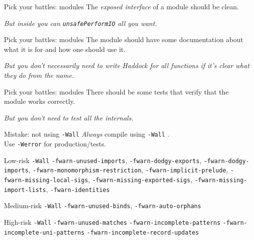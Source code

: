 \documentclass[20pt]{beamer}
\newcommand{\vspaced}{
    \vspace{5mm}
}
\newcommand{\code}[1]{
    \texttt{\small{#1}}
}
\begin{document}
\begin{frame}{Pick your battles: modules}
    The \emph{exposed interface} of a module should be clean. \\
    \vspaced
    \emph{\small{But inside you can \code{unsafePerformIO} all you want.}}
\end{frame}

\begin{frame}{Pick your battles: modules}
    The module should have some documentation about what it is for and how one
    should use it. \\
    \vspaced
    \emph{\small{But you don't necessarily need to write Haddock for all
    functions if it's clear what they do from the name.}}
\end{frame}

\begin{frame}{Pick your battles: modules}
    There should be some tests that verify that the module works correctly. \\
    \vspaced
    \emph{\small{But you don't need to test all the internals.}}
\end{frame}


\begin{frame}{Mistake: not using \code{-Wall}}
    \emph{Always} compile using \code{-Wall}. \\
    Use \code{-Werror} for production/tests.
\end{frame}

\begin{frame}{Low-risk \code{-Wall}}
    \small{
    \texttt{-fwarn-unused-imports},
    \texttt{-fwarn-dodgy-exports},
    \texttt{-fwarn-dodgy-imports},
    \texttt{-fwarn-monomorphism-restriction},
    \texttt{-fwarn-implicit-prelude},
    \texttt{-fwarn-missing-local-sigs},
    \texttt{-fwarn-missing-exported-sigs},
    \texttt{-fwarn-missing-import-lists},
    \texttt{-fwarn-identities}
    }
\end{frame}

\begin{frame}{Medium-risk \code{-Wall}}
    \small{
    \texttt{-fwarn-unused-binds},
    \texttt{-fwarn-auto-orphans}
    }
\end{frame}

\begin{frame}{High-risk \code{-Wall}}
    \small{
    \texttt{-fwarn-unused-matches}
    \texttt{-fwarn-incomplete-patterns}
    \texttt{-fwarn-incomplete-uni-patterns}
    \texttt{-fwarn-incomplete-record-updates}
    }
\end{frame}
\end{document}
